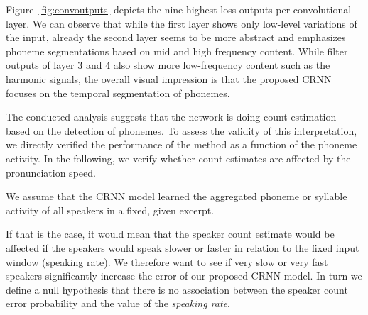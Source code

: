 Figure~\ref{fig:convoutputs} depicts the nine highest loss outputs per convolutional layer.
We can observe that while the first layer shows only low-level variations of the input, already the second layer seems to be more abstract and emphasizes phoneme segmentations based on mid and high frequency content.
While filter outputs of layer 3 and 4 also show more low-frequency content such as the harmonic signals, the overall visual impression is that the proposed CRNN focuses on the temporal segmentation of phonemes.\par

The conducted analysis suggests that the network is doing count estimation based on the detection of phonemes. To assess the validity of this interpretation, we directly verified the performance of the method as a function of the phoneme activity. In the following, we verify whether count estimates are affected by the pronunciation speed.\par

We assume that the CRNN model learned the aggregated phoneme or syllable activity of all speakers in a fixed, given excerpt.


If that is the case, it would mean that the speaker count estimate would be affected if the speakers would speak slower or faster in relation to the fixed input window (speaking rate).
We therefore want to see if very slow or very fast speakers significantly increase the error of our proposed CRNN model.
In turn we define a null hypothesis that there is no association between the speaker count error probability and the value of the \emph{speaking rate}.\par

